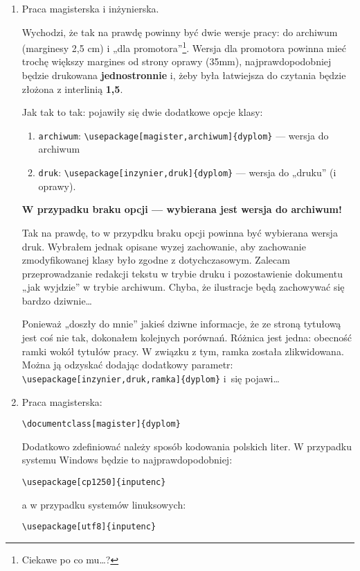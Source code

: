 \begin{enumerate}
\item
Praca magisterska i inżynierska.

Wychodzi, że tak na prawdę powinny być dwie wersje pracy: do archiwum (marginesy 2,5 cm) i „dla promotora”\footnote{Ciekawe po co mu…?}. Wersja dla promotora powinna mieć trochę większy margines od strony oprawy (35mm), najprawdopodobniej będzie drukowana \textbf{jednostronnie} i, żeby była łatwiejsza do czytania będzie złożona z interlinią \textbf{1,5}.

Jak tak to tak:  pojawiły się dwie dodatkowe opcje klasy:
\begin{enumerate}
\item
\texttt{archiwum}: \verb|\usepackage[magister,archiwum]{dyplom}| — wersja do archiwum
\item
\texttt{druk}: \verb|\usepackage[inzynier,druk]{dyplom}| — wersja do „druku” (i oprawy).
\end{enumerate}
\textbf{W przypadku braku opcji — wybierana jest wersja do archiwum!}

Tak na prawdę, to w przypdku braku opcji powinna być wybierana wersja druk. Wybrałem jednak opisane wyzej zachowanie, aby zachowanie zmodyfikowanej klasy było zgodne z dotychczasowym. Zalecam przeprowadzanie redakcji tekstu w trybie druku i pozostawienie dokumentu „jak wyjdzie” w trybie archiwum. Chyba, że ilustracje będą zachowywać się bardzo dziwnie…

Ponieważ „doszły do mnie” jakieś dziwne informacje, że ze stroną tytułową jest coś nie tak, dokonałem kolejnych porównań. Różnica jest jedna: obecność ramki wokół tytułów pracy. W związku z tym, ramka została zlikwidowana. Można ją odzyskać dodając dodatkowy parametr: \verb|\usepackage[inzynier,druk,ramka]{dyplom}| i~się pojawi…
\item
Praca magisterska:
\begin{verbatim}
\documentclass[magister]{dyplom}
\end{verbatim}
Dodatkowo zdefiniować należy sposób kodowania polskich liter. W przypadku systemu Windows będzie to najprawdopodobniej:
\begin{verbatim}
\usepackage[cp1250]{inputenc}
\end{verbatim}
a w przypadku systemów linuksowych:
\begin{verbatim}
\usepackage[utf8]{inputenc}
\end{verbatim}


\end{enumerate}
